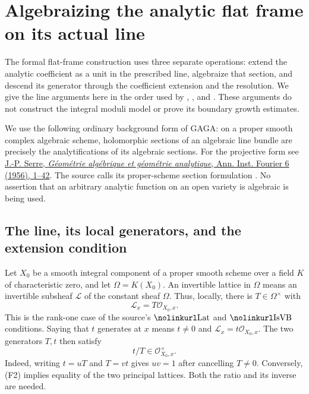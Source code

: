 \section{Algebraizing the analytic flat frame on its actual line}
\label{sec:faithful-flat-line-extension}

The formal flat-frame construction uses three separate operations:
extend the analytic coefficient as a unit in the prescribed line,
algebraize that section, and descend its generator through the
coefficient extension and the resolution.  We give the line arguments
here in the order used by ,
, and
.  These arguments do not construct the
integral moduli model or prove its boundary growth estimates.

We use the following ordinary background form of GAGA: on a proper
smooth complex algebraic scheme, holomorphic sections of an algebraic
line bundle are precisely the analytifications of its algebraic
sections.  For the projective form see
\href{https://numdam.org/articles/10.5802/aif.59/}
{J.-P. Serre, \emph{G\'eom\'etrie alg\'ebrique et g\'eom\'etrie analytique},
Ann. Inst. Fourier 6 (1956), 1--42}.
The source calls its proper-scheme section formulation
.  No assertion that an arbitrary analytic function
on an open variety is algebraic is being used.

\subsection{The line, its local generators, and the extension condition}

Let \(X_0\) be a smooth integral component of a proper smooth scheme
over a field \(K\) of characteristic zero, and let
\(\Omega=K(X_0)\).  An invertible lattice in \(\Omega\) means an
invertible subsheaf \(\mathcal L\) of the constant sheaf \(\Omega\).
Thus, locally, there is \(T\in\Omega^\times\) with
\[
                         \mathcal L_x=T\mathcal O_{X_0,x}.
 \tag{F1}\label{eq:faithful-line-generator}
\]
This is the rank-one case of the source's \(\srcid{Lat}\) and
\(\srcid{IsVB}\) conditions.  Saying that \(t\) generates at \(x\)
means \(t\ne0\) and
\(\mathcal L_x=t\mathcal O_{X_0,x}\).
The two generators \(T,t\) then satisfy
\[
             t/T\in\mathcal O_{X_0,x}^{\times}.
 \tag{F2}\label{eq:faithful-line-unit-ratio}
\]
Indeed, writing \(t=uT\) and \(T=vt\) gives \(uv=1\) after
cancelling \(T\ne0\).  Conversely, (F2) implies equality of the
two principal lattices.  Both the ratio and its inverse are needed.


